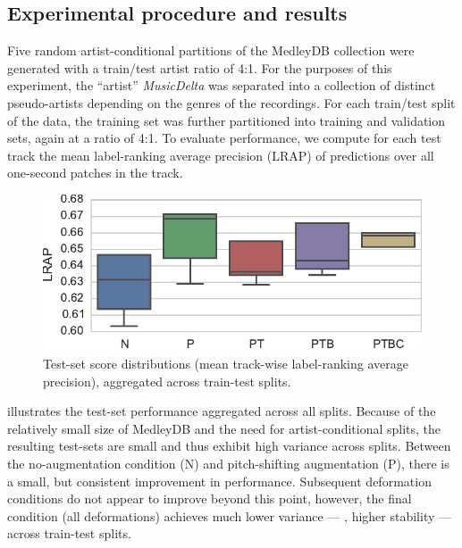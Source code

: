 \documentclass{article}
\begin{document}
\subsection{Experimental procedure and results}

Five random artist-conditional partitions of the MedleyDB collection were generated with
a train/test artist ratio of 4:1.  For the purposes of this experiment,
the ``artist'' \emph{MusicDelta} was separated into a collection of distinct pseudo-artists
depending on the genres of the recordings.
For each train/test split of the data, the training set was further partitioned into
training and validation sets, again at a ratio of 4:1.
To evaluate performance, we compute for each test track the mean label-ranking average
precision (LRAP) of predictions over all one-second patches in the track.  


\begin{figure}
    \centering
    \includegraphics[width=\columnwidth]{figs/lrapall}
    \caption{Test-set score distributions (mean track-wise label-ranking average precision), aggregated across train-test splits.\label{lrapresults}}
\end{figure}

 illustrates the test-set performance aggregated across all splits. 
Because of the relatively small size of MedleyDB and the need for
artist-conditional splits, the resulting test-sets are small and thus exhibit high
variance across splits.  
Between the no-augmentation condition (N) and pitch-shifting augmentation (P), 
there is a small, but consistent improvement in performance.
Subsequent deformation conditions do not appear to improve beyond this point, however,
the final condition (all deformations) achieves much lower variance --- \ie, higher
stability --- across train-test splits.
\end{document}
